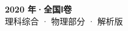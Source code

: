 \documentclass[zihao=-4, a4paper]{ctexart}
\begin{document}
\begin{center}
  {\Large\bfseries 2020 年·全国Ⅰ卷}\\[4pt]
  {\large 理科综合 · 物理部分 · 解析版}
\end{center}
\medskip
{}

\clearpage
{}

\end{document}
